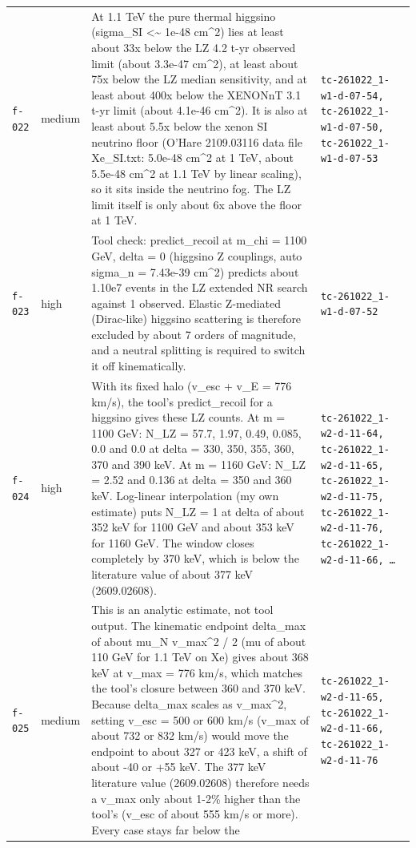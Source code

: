 \documentclass[11pt,a4paper]{article}
\begin{document}
\begin{longtable}{@{}p{}p{}p{}p{}@{}}
\texttt{f-022} & medium & At 1.1 TeV the pure thermal higgsino (sigma\_SI \textless{}\textasciitilde{} 1e-48 cm\textasciicircum{}2) lies at least about 33x below the LZ 4.2 t-yr observed limit (about 3.3e-47 cm\textasciicircum{}2), at least about 75x below the LZ median sensitivity, and at least about 400x below the XENONnT 3.1 t-yr limit (about 4.1e-46 cm\textasciicircum{}2). It is also at least about 5.5x below the xenon SI neutrino floor (O'Hare 2109.03116 data file Xe\_SI.txt: 5.0e-48 cm\textasciicircum{}2 at 1 TeV, about 5.5e-48 cm\textasciicircum{}2 at 1.1 TeV by linear scaling), so it sits inside the neutrino fog. The LZ limit itself is only about 6x above the floor at 1 TeV. & \texttt{tc-261022\_\allowbreak{}1-w1-d-07-54,\allowbreak{} tc-261022\_\allowbreak{}1-w1-d-07-50,\allowbreak{} tc-261022\_\allowbreak{}1-w1-d-07-53} \\
\texttt{f-023} & high & Tool check: predict\_recoil at m\_chi = 1100 GeV, delta = 0 (higgsino Z couplings, auto sigma\_n = 7.43e-39 cm\textasciicircum{}2) predicts about 1.10e7 events in the LZ extended NR search against 1 observed. Elastic Z-mediated (Dirac-like) higgsino scattering is therefore excluded by about 7 orders of magnitude, and a neutral splitting is required to switch it off kinematically. & \texttt{tc-261022\_\allowbreak{}1-w1-d-07-52} \\
\texttt{f-024} & high & With its fixed halo (v\_esc + v\_E = 776 km/s), the tool's predict\_recoil for a higgsino gives these LZ counts. At m = 1100 GeV: N\_LZ = 57.7, 1.97, 0.49, 0.085, 0.0 and 0.0 at delta = 330, 350, 355, 360, 370 and 390 keV. At m = 1160 GeV: N\_LZ = 2.52 and 0.136 at delta = 350 and 360 keV. Log-linear interpolation (my own estimate) puts N\_LZ = 1 at delta of about 352 keV for 1100 GeV and about 353 keV for 1160 GeV. The window closes completely by 370 keV, which is below the literature value of about 377 keV (2609.02608). & \texttt{tc-261022\_\allowbreak{}1-w2-d-11-64,\allowbreak{} tc-261022\_\allowbreak{}1-w2-d-11-65,\allowbreak{} tc-261022\_\allowbreak{}1-w2-d-11-75,\allowbreak{} tc-261022\_\allowbreak{}1-w2-d-11-76,\allowbreak{} tc-261022\_\allowbreak{}1-w2-d-11-66,\allowbreak{} \ldots{}\allowbreak{}} \\
\texttt{f-025} & medium & This is an analytic estimate, not tool output. The kinematic endpoint delta\_max of about mu\_N v\_max\textasciicircum{}2 / 2 (mu of about 110 GeV for 1.1 TeV on Xe) gives about 368 keV at v\_max = 776 km/s, which matches the tool's closure between 360 and 370 keV. Because delta\_max scales as v\_max\textasciicircum{}2, setting v\_esc = 500 or 600 km/s (v\_max of about 732 or 832 km/s) would move the endpoint to about 327 or 423 keV, a shift of about -40 or +55 keV. The 377 keV literature value (2609.02608) therefore needs a v\_max only about 1-2\% higher than the tool's (v\_esc of about 555 km/s or more). Every case stays far below the  & \texttt{tc-261022\_\allowbreak{}1-w2-d-11-65,\allowbreak{} tc-261022\_\allowbreak{}1-w2-d-11-66,\allowbreak{} tc-261022\_\allowbreak{}1-w2-d-11-76} \\

\end{longtable}
\end{document}
